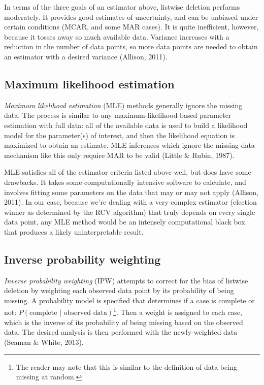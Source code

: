 \documentclass[12pt,twoside]{reedthesis}
\begin{document}
In terms of the three goals of an estimator above, listwise deletion performs moderately. It provides good estimates of uncertainty, and can be unbiased under certain conditions (MCAR, and some MAR cases). It is quite inefficient, however, because it tosses away so much available data. Variance increases with a reduction in the number of data points, so more data points are needed to obtain an estimator with a desired variance (Allison, 2011).

\hypertarget{maximum-likelihood-estimation}{%
\subsection{Maximum likelihood estimation}\label{maximum-likelihood-estimation}}

\emph{Maximum likelihood estimation} (MLE) methods generally ignore the missing data. The process is similar to any maximum-likelihood-based parameter estimation with full data: all of the available data is used to build a likelihood model for the parameter(s) of interest, and then the likelihood equation is maximized to obtain an estimate. MLE inferences which ignore the missing-data mechanism like this only require MAR to be valid (Little \& Rubin, 1987).

MLE satisfies all of the estimator criteria listed above well, but does have some drawbacks. It takes some computationally intensive software to calculate, and involves fitting some parameters on the data that may or may not apply (Allison, 2011). In our case, because we're dealing with a very complex estimator (election winner as determined by the RCV algorithm) that truly depends on every single data point, any MLE method would be an intensely computational black box that produces a likely uninterpretable result.

\hypertarget{inverse-probability-weighting}{%
\subsection{Inverse probability weighting}\label{inverse-probability-weighting}}

\emph{Inverse probability weighting} (IPW) attempts to correct for the bias of listwise deletion by weighting each observed data point by its probability of being missing. A probability model is specified that determines if a case is complete or not: \(P(\text{complete }|\text{ observed data})\)\footnote{The reader may note that this is similar to the definition of data being missing at random.}. Then a weight is assigned to each case, which is the inverse of its probability of being missing based on the observed data. The desired analysis is then performed with the newly-weighted data (Seaman \& White, 2013).
\end{document}
